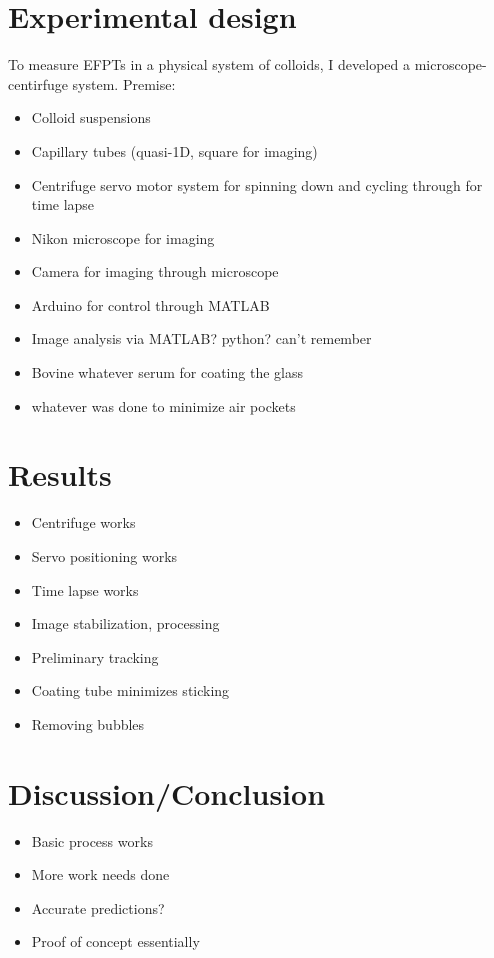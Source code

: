 \section{Experimental design}
To measure EFPTs in a physical system of colloids, I developed a microscope-centirfuge system. Premise:
\begin{itemize}
    \item Colloid suspensions
    \item Capillary tubes (quasi-1D, square for imaging)
    \item Centrifuge servo motor system for spinning down and cycling through for time lapse
    \item Nikon microscope for imaging
    \item Camera for imaging through microscope
    \item Arduino for control through MATLAB
    \item Image analysis via MATLAB? python? can't remember
    \item Bovine whatever serum for coating the glass
    \item whatever was done to minimize air pockets
\end{itemize}
 
\section{Results}
\begin{itemize}
    \item Centrifuge works
    \item Servo positioning works
    \item Time lapse works
    \item Image stabilization, processing
    \item Preliminary tracking
    \item Coating tube minimizes sticking
    \item Removing bubbles
\end{itemize}

\section{Discussion/Conclusion}
\begin{itemize}
    \item Basic process works
    \item More work needs done
    \item Accurate predictions?
    \item Proof of concept essentially
\end{itemize}



%
%

